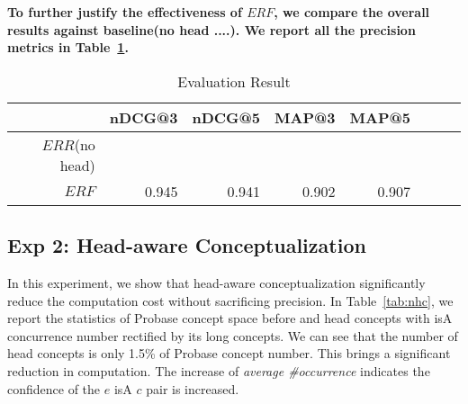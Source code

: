 

{\bf 
To further justify the effectiveness of $ERF$, we compare the overall results against baseline(no head ....).
  We report all the precision metrics in Table~\ref{tab:ndcg}. 
}

\begin{table}[!htbp]
\vspace{-4mm}
\small	
  \centering
  \caption{Evaluation Result}
	\begin{tabular}{rrrrrrrr}
	\toprule
	     & nDCG@3 & nDCG@5 & MAP@3 & MAP@5 \\
	\midrule
	$ERR$(no head) &      &      &      &  \\
	$ERF$ & 0.945 & 0.941 & 0.902 & 0.907\\
	\bottomrule
	\end{tabular}%

  \label{tab:ndcg}%
  \vspace{-4mm}
\end{table}%





\subsection{Exp 2: Head-aware Conceptualization}
In this experiment, we show that head-aware conceptualization significantly reduce the computation cost without sacrificing precision. In Table~\ref{tab:nhc}, we report the statistics of Probase concept space before and head concepts with isA concurrence number rectified by its long concepts. We can see that the number of head concepts is only 1.5\% of Probase concept number. This brings a significant reduction in computation. 
The increase of \emph{average \#occurrence} indicates the confidence of the $e$ isA $c$ pair is increased.


